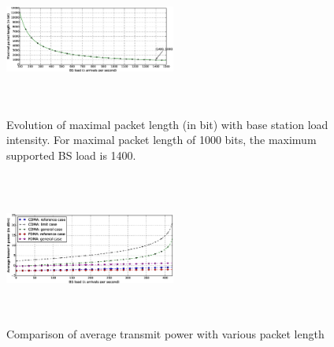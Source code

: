 \begin{figure}[hb]
	\centering
	\includegraphics[width=0.5\textwidth, height=5cm]{Chapter3/Figures/Maximal-packet-length-evolution}
	\caption{Evolution of maximal packet length (in bit) with base station load intensity. For maximal packet length of 1000 bits, the maximum supported BS load is 1400.}
	\label{fig:maximal-packet-length}
\end{figure}
\begin{figure}[!tb]
	\centering
	\includegraphics[width=0.5\textwidth, height=5cm]{Chapter3/Figures/Average-Transmit-Power-Variant-Target-SNR}
	\caption{Comparison of average transmit power with various packet length }
	\label{fig:Average-Transmit-Power-Variant-Target-SNR}
\end{figure}
